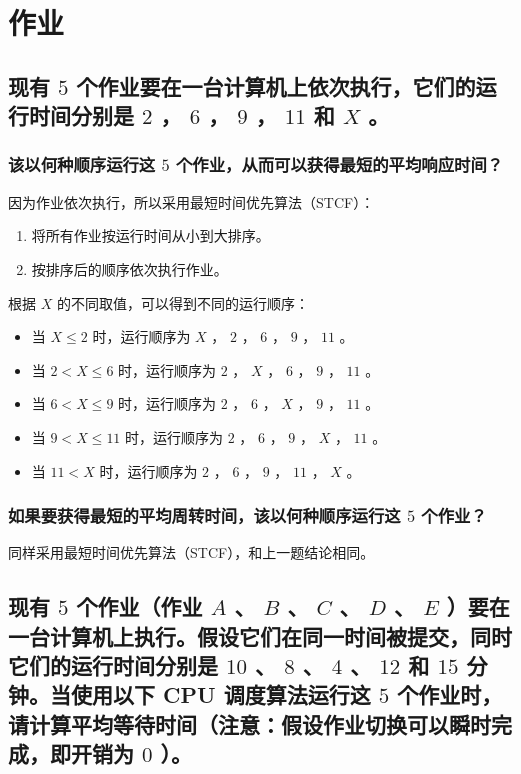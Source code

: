 \section{作业}

\subsection{
    现有 $5$ 个作业要在⼀台计算机上依次执⾏，它们的运⾏时间分别是 $2$ ， $6$ ， $9$ ， $11$ 和 $X$ 。
}

\subsubsection{
    该以何种顺序运⾏这 $5$ 个作业，从⽽可以获得最短的平均响应时间？
}

因为作业依次执行，所以采用最短时间优先算法（STCF）：

\begin{enumerate}
    \item 将所有作业按运行时间从小到大排序。
    \item 按排序后的顺序依次执行作业。
\end{enumerate}

根据 $X$ 的不同取值，可以得到不同的运行顺序：

\begin{itemize}
    \item 当 $X \le 2$ 时，运行顺序为 $X$ ， $2$ ， $6$ ， $9$ ， $11$ 。
    \item 当 $2 < X \le 6$ 时，运行顺序为 $2$ ， $X$ ， $6$ ， $9$ ， $11$ 。
    \item 当 $6 < X \le 9$ 时，运行顺序为 $2$ ， $6$ ， $X$ ， $9$ ， $11$ 。
    \item 当 $9 < X \le 11$ 时，运行顺序为 $2$ ， $6$ ， $9$ ， $X$ ， $11$ 。
    \item 当 $11 < X$ 时，运行顺序为 $2$ ， $6$ ， $9$ ， $11$ ， $X$ 。
\end{itemize}

\subsubsection{
    如果要获得最短的平均周转时间，该以何种顺序运⾏这 $5$ 个作业？
}

同样采用最短时间优先算法（STCF），和上一题结论相同。

\subsection{
    现有 $5$ 个作业（作业 $A$ 、 $B$ 、 $C$ 、 $D$ 、 $E$ ）要在⼀台计算机上执⾏。假设它们在同⼀时间被提交，同时它们的运⾏时间分别是 $10$ 、 $8$ 、 $4$ 、 $12$ 和 $15$ 分钟。当使⽤以下 CPU 调度算法运⾏这 $5$ 个作业时，请计算平均等待时间（注意：假设作业切换可以瞬时完成，即开销为 $0$ ）。
}

